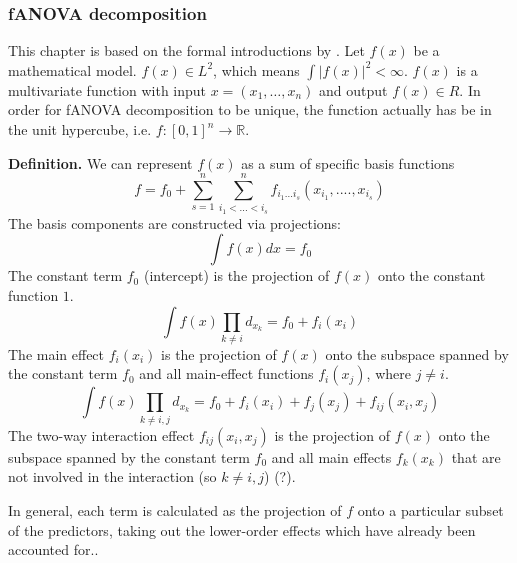 \subsubsection{fANOVA decomposition}
This chapter is based on the formal introductions by \cite{hoeffding_class_1948, sobol_global_2001, hooker_discovering_2004}.
Let $f(x)$ be a mathematical model. $f(x) \in L^2$, which means $\int|f(x)|^2 < \infty$. $f(x)$ is a multivariate function with input $x = (x_1,\dots, x_n)$ and output $f(x) \in R$.
In order for fANOVA decomposition to be unique, the function actually has be in the unit hypercube, i.e. $f: [0,1]^n \rightarrow \mathbb{R}$.\par
\textbf{Definition.} We can represent $f(x)$ as a sum of specific basis functions
\begin{equation}
    f = f_0 + \sum_{s=1}^{n} \sum_{i_1 <...<i_s}^{n} f_{i_{1}...i_{s}} (x_{i_{1}} , ....,x_{i_{s}})
    \label{eq:fanova_decomposition}
\end{equation}
The basis components are constructed via projections:
\begin{equation}
    \int f(x) dx = f_0
\end{equation}
The constant term $f_0$ (intercept) is the projection of $f(x)$ onto the constant function $1$.
\begin{equation}
    \int f(x) \prod_{k \neq i} d_{x_{k}} = f_0 + f_i(x_i)
\end{equation}
The main effect $f_i(x_i)$ is the projection of $f(x)$ onto the subspace spanned by the constant term $f_0$ and all main-effect functions $f_i(x_j)$, where $j \neq i$. 
\begin{equation}
    \int f(x) \prod_{k \neq i,j} d_{x_{k}} = f_0 + f_i(x_i) + f_j(x_j) + f_{ij}(x_i,x_j)
\end{equation}
The two-way interaction effect $f_{ij}(x_i,x_j)$ is the projection of $f(x)$ onto the subspace spanned by the constant term $f_0$ and all main effects $f_k(x_k)$ that are not involved in the interaction (so $k \neq i,j$) (?).\par
In general, \ldq each term is calculated as the projection of $f$ onto a particular subset of the predictors, taking out the lower-order effects which have already been accounted for.\rdq \cite{hooker_discovering_2004}.\par

